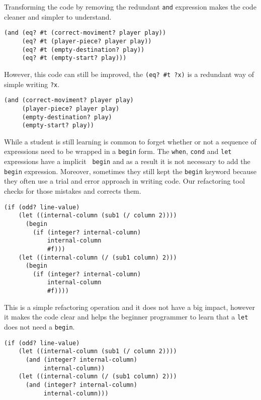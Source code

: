 Transforming the code by removing the redundant {\tt and} expression makes the code
cleaner and simpler to understand.
\begin{lstlisting}
(and (eq? #t (correct-moviment? player play))
     (eq? #t (player-piece? player play))
     (eq? #t (empty-destination? play))
     (eq? #t (empty-start? play)))
\end{lstlisting}

However, this code can still be improved, the {\tt (eq? \#t ?x)} is a redundant way
of simple writing {\tt ?x}.
\begin{lstlisting}
(and (correct-moviment? player play)
     (player-piece? player play)
     (empty-destination? play)
     (empty-start? play))
\end{lstlisting}

While a student is still learning is common to forget whether or not a
sequence of expressions need to be wrapped in a {\tt begin} form.  The
{\tt when}, {\tt cond} and {\tt let} expressions have a implicit {\tt
  begin} and as a result it is not necessary to add the {\tt begin}
expression.  Moreover, sometimes they still kept the {\tt begin}
keyword because they often use a trial and error approach in writing
code.  Our refactoring tool checks for those mistakes and corrects
them.
\begin{lstlisting}
(if (odd? line-value)
    (let ((internal-column (sub1 (/ column 2))))
      (begin
        (if (integer? internal-column)
            internal-column
            #f)))
    (let ((internal-column (/ (sub1 column) 2)))
      (begin
        (if (integer? internal-column)
            internal-column
            #f))))
\end{lstlisting}
This is a simple refactoring operation and it does not have a big
impact, however it makes the code clear and helps the beginner
programmer to learn that a {\tt let} does not need a {\tt begin}.
\begin{lstlisting}
(if (odd? line-value)
    (let ((internal-column (sub1 (/ column 2))))
      (and (integer? internal-column)
           internal-column))
    (let ((internal-column (/ (sub1 column) 2)))
      (and (integer? internal-column)
           internal-column)))
\end{lstlisting}



